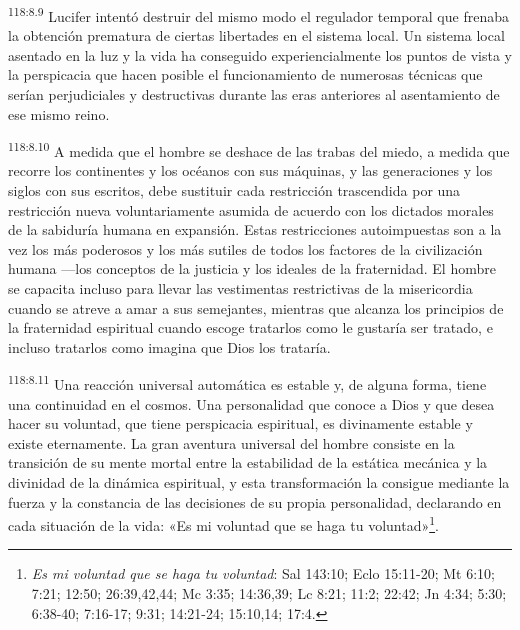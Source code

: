 \par
\textsuperscript{118:8.9} Lucifer intentó destruir del mismo modo el regulador temporal que frenaba la obtención prematura de ciertas libertades en el sistema local. Un sistema local asentado en la luz y la vida ha conseguido experiencialmente los puntos de vista y la perspicacia que hacen posible el funcionamiento de numerosas técnicas que serían perjudiciales y destructivas durante las eras anteriores al asentamiento de ese mismo reino.

\par
\textsuperscript{118:8.10} A medida que el hombre se deshace de las trabas del miedo, a medida que recorre los continentes y los océanos con sus máquinas, y las generaciones y los siglos con sus escritos, debe sustituir cada restricción trascendida por una restricción nueva voluntariamente asumida de acuerdo con los dictados morales de la sabiduría humana en expansión. Estas restricciones autoimpuestas son a la vez los más poderosos y los más sutiles de todos los factores de la civilización humana ---los conceptos de la justicia y los ideales de la fraternidad. El hombre se capacita incluso para llevar las vestimentas restrictivas de la misericordia cuando se atreve a amar a sus semejantes, mientras que alcanza los principios de la fraternidad espiritual cuando escoge tratarlos como le gustaría ser tratado, e incluso tratarlos como imagina que Dios los trataría.

\par
\textsuperscript{118:8.11} Una reacción universal automática es estable y, de alguna forma, tiene una continuidad en el cosmos. Una personalidad que conoce a Dios y que desea hacer su voluntad, que tiene perspicacia espiritual, es divinamente estable y existe eternamente. La gran aventura universal del hombre consiste en la transición de su mente mortal entre la estabilidad de la estática mecánica y la divinidad de la dinámica espiritual, y esta transformación la consigue mediante la fuerza y la constancia de las decisiones de su propia personalidad, declarando en cada situación de la vida: «Es mi voluntad que se haga tu voluntad»\footnote{\textit{Es mi voluntad que se haga tu voluntad}: Sal 143:10; Eclo 15:11-20; Mt 6:10; 7:21; 12:50; 26:39,42,44; Mc 3:35; 14:36,39; Lc 8:21; 11:2; 22:42; Jn 4:34; 5:30; 6:38-40; 7:16-17; 9:31; 14:21-24; 15:10,14; 17:4.}.

